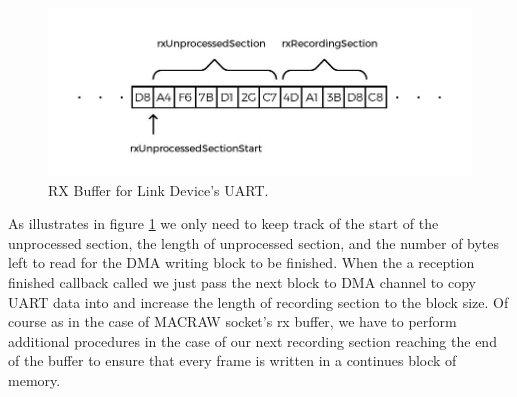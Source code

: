 \begin{figure}[htp]
\begin{center}
\includegraphics[width=1\textwidth]{dma-rx-buffer}
\end{center}
\caption{RX Buffer for Link Device's UART.}
\label{dma-rx-buffer}
\end{figure}

As illustrates in figure \ref{dma-rx-buffer} we only need to keep track of the start of the unprocessed section, the length of unprocessed section, and the number of bytes left to read for the DMA writing block to be finished. When the a reception finished callback called we just pass the next block to DMA channel to copy UART data into and increase the length of recording section to the block size. Of course as in the case of MACRAW socket's rx buffer, we have to perform additional procedures in the case of our next recording section reaching the end of the buffer to ensure that every frame is written in a continues block of memory.  